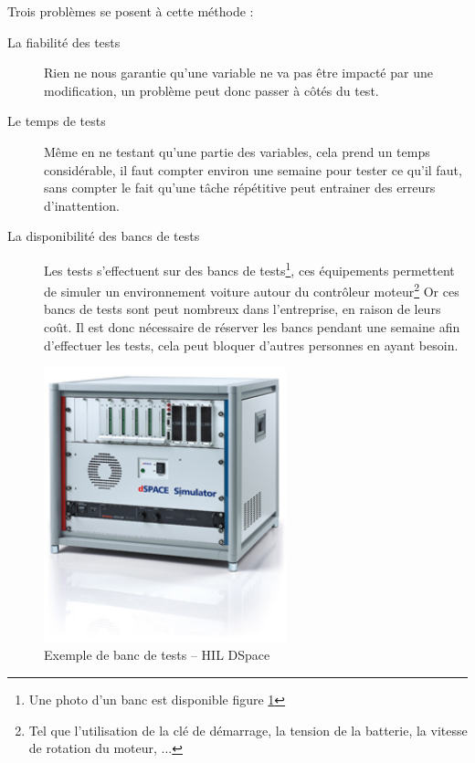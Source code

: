 	Trois problèmes se posent à cette méthode : 
	\begin{description}
		\item[La fiabilité des tests] Rien ne nous garantie qu'une variable ne va pas être impacté par une modification, un problème peut donc passer à côtés du test.
		\item[Le temps de tests] Même en ne testant qu'une partie des variables, cela prend un temps considérable, il faut compter environ une semaine pour tester ce qu'il faut, sans compter le fait qu'une tâche répétitive peut entrainer des erreurs d'inattention.
		\item[La disponibilité des bancs de tests]	Les tests s'effectuent sur des bancs de tests\footnote{Une photo d'un banc est disponible figure \ref{fig:photoHil}}, ces équipements permettent de simuler un environnement voiture autour du contrôleur moteur\footnote{Tel que l'utilisation de la clé de démarrage, la tension de la batterie, la vitesse de rotation du moteur, ...} Or ces bancs de tests sont peut nombreux dans l'entreprise, en raison de leurs coût. Il est donc nécessaire de réserver les bancs pendant une semaine afin d'effectuer les tests, cela peut bloquer d'autres personnes en ayant besoin.
	\end{description}
	\begin{figure}[H]
		\centering
		\includegraphics[width=7cm]{contents/images/hil.jpg}
		\caption{Exemple de banc de tests -- HIL DSpace}
		\label{fig:photoHil}
	\end{figure}


